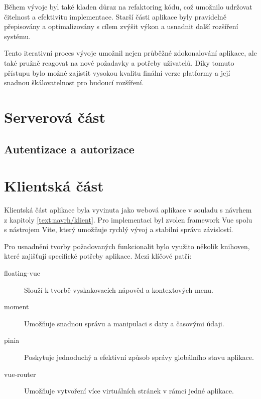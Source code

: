 Během vývoje byl také kladen důraz na refaktoring kódu, což umožnilo udržovat čitelnost a efektivitu implementace. 
Starší části aplikace byly pravidelně přepisovány a optimalizovány s cílem zvýšit výkon a usnadnit další rozšíření systému.

Tento iterativní proces vývoje umožnil nejen průběžné zdokonalování aplikace, ale také pružně reagovat na nové požadavky a potřeby uživatelů. 
Díky tomuto přístupu bylo možné zajistit vysokou kvalitu finální verze platformy a její snadnou škálovatelnost pro budoucí rozšíření.



\section{Serverová část}

\subsection{Autentizace a autorizace}

\section{Klientská část}\label{text:realizace/klient}

Klientská část aplikace byla vyvinuta jako webová aplikace v souladu s návrhem z kapitoly \ref{text:navrh/klient}. 
Pro implementaci byl zvolen framework Vue spolu s nástrojem Vite, který umožňuje rychlý vývoj a stabilní správu závislostí.

Pro usnadnění tvorby požadovaných funkcionalit bylo využito několik knihoven, které zajišťují specifické potřeby aplikace. 
Mezi klíčové patří:

\begin{description}
    \item[floating-vue] Slouží k tvorbě vyskakovacích nápověd a kontextových menu.
    \item[moment] Umožňuje snadnou správu a manipulaci s daty a časovými údaji.
    \item[pinia] Poskytuje jednoduchý a efektivní způsob správy globálního stavu aplikace.
    \item[vue-router] Umožňuje vytvoření více virtuálních stránek v rámci jedné aplikace.
\end{description}

